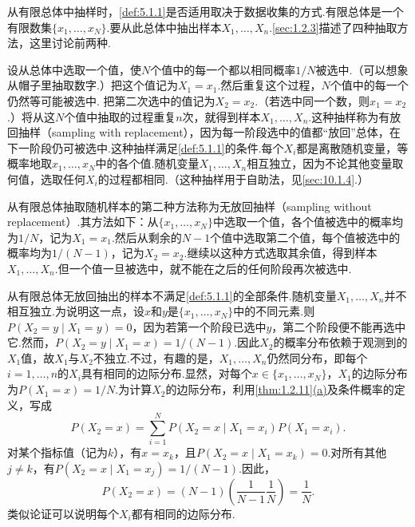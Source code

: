 从有限总体中抽样时，\autoref{def:5.1.1}是否适用取决于数据收集的方式.有限总体是一个有限数集$\{x_1,\ldots,x_N\}$.要从此总体中抽出样本$X_1,\ldots,X_n$.\autoref{sec:1.2.3}描述了四种抽取方法，这里讨论前两种.

设从总体中选取一个值，使$N$个值中的每一个都以相同概率$1/N$被选中.（可以想象从帽子里抽取数字.）把这个值记为$X_1=x_1$.然后重复这个过程，$N$个值中的每一个仍然等可能被选中.
把第二次选中的值记为$X_2=x_2$.（若选中同一个数，则$x_1=x_2$.）将从这$N$个值中抽取的过程重复$n$次，就得到样本$X_1,\ldots,X_n$.这种抽样称为有放回抽样（sampling with replacement），因为每一阶段选中的值都“放回”总体，在下一阶段仍可被选中.这种抽样满足\autoref{def:5.1.1}的条件.每个$X_i$都是离散随机变量，等概率地取$x_1,\ldots,x_N$中的各个值.随机变量$X_1,\ldots,X_n$相互独立，因为不论其他变量取何值，选取任何$X_i$的过程都相同.（这种抽样用于自助法，见\autoref{sec:10.1.4}.）

从有限总体抽取随机样本的第二种方法称为无放回抽样（sampling without replacement）.其方法如下：从$\{x_1,\ldots,x_N\}$中选取一个值，各个值被选中的概率均为$1/N$，记为$X_1=x_1$.然后从剩余的$N-1$个值中选取第二个值，每个值被选中的概率均为$1/(N-1)$，记为$X_2=x_2$.继续以这种方式选取其余值，得到样本$X_1,\ldots,X_n$.但一个值一旦被选中，就不能在之后的任何阶段再次被选中.

从有限总体无放回抽出的样本不满足\autoref{def:5.1.1}的全部条件.随机变量$X_1,\ldots,X_n$并不相互独立.为说明这一点，设$x$和$y$是$\{x_1,\ldots,x_N\}$中的不同元素.则$P(X_2=y\mid X_1=y)=0$，因为若第一个阶段已选中$y$，第二个阶段便不能再选中它.然而，$P(X_2=y\mid X_1=x)=1/(N-1)$.因此$X_2$的概率分布依赖于观测到的$X_1$值，故$X_1$与$X_2$不独立.不过，有趣的是，$X_1,\ldots,X_n$仍然同分布，即每个$i=1,\ldots,n$的$X_i$具有相同的边际分布.显然，对每个$x\in\{x_1,\ldots,x_N\}$，$X_1$的边际分布为$P(X_1=x)=1/N$.为计算$X_2$的边际分布，利用\autoref{thm:1.2.11}\hyperref[itm:thm:1.2.11:a]{(a)}及条件概率的定义，写成
$$P(X_2=x)=\sum_{i=1}^N P(X_2=x\mid X_1=x_i)P(X_1=x_i).$$
对某个指标值（记为$k$），有$x=x_k$，且$P(X_2=x\mid X_1=x_k)=0$.对所有其他$j\ne k$，有$P(X_2=x\mid X_1=x_j)=1/(N-1)$.因此，
\begin{equation}\label{eq:5.1.3}
P(X_2=x)=(N-1)\left(\frac1{N-1}\frac1N\right)=\frac1N.
\end{equation}
类似论证可以说明每个$X_i$都有相同的边际分布.

